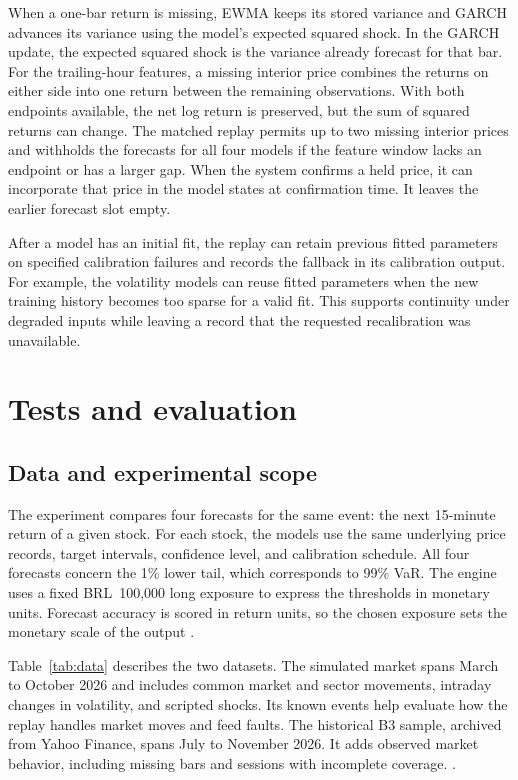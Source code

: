 \documentclass[
	12pt,				%
	openright,			%
	twoside,			%
	a4paper,
	chapter=TITLE,
	english				%
	]{abntex2}
\begin{document}
When a one-bar return is missing, EWMA keeps its stored variance and GARCH advances its variance using the model's expected squared shock. In the GARCH update, the expected squared shock is the variance already forecast for that bar. For the trailing-hour features, a missing interior price combines the returns on either side into one return between the remaining observations. With both endpoints available, the net log return is preserved, but the sum of squared returns can change. The matched replay permits up to two missing interior prices and withholds the forecasts for all four models if the feature window lacks an endpoint or has a larger gap. When the system confirms a held price, it can incorporate that price in the model states at confirmation time. It leaves the earlier forecast slot empty.

After a model has an initial fit, the replay can retain previous fitted parameters on specified calibration failures and records the fallback in its calibration output. For example, the volatility models can reuse fitted parameters when the new training history becomes too sparse for a valid fit. This supports continuity under degraded inputs while leaving a record that the requested recalibration was unavailable.

\section{Tests and evaluation}
\label{sec:testing-evaluation}

\subsection{Data and experimental scope}

The experiment compares four forecasts for the same event: the next 15-minute return of a given stock. For each stock, the models use the same underlying price records, target intervals, confidence level, and calibration schedule. All four forecasts concern the 1\% lower tail, which corresponds to 99\% VaR. The engine uses a fixed BRL~100,000 long exposure to express the thresholds in monetary units. Forecast accuracy is scored in return units, so the chosen exposure sets the monetary scale of the output \cite{project-comparison}.

Table~\ref{tab:data} describes the two datasets. The simulated market spans March to October 2026 and includes common market and sector movements, intraday changes in volatility, and scripted shocks. Its known events help evaluate how the replay handles market moves and feed faults. The historical B3 sample, archived from Yahoo Finance, spans July to November 2026. It adds observed market behavior, including missing bars and sessions with incomplete coverage. \cite{project-data,project-comparison}.
\end{document}
